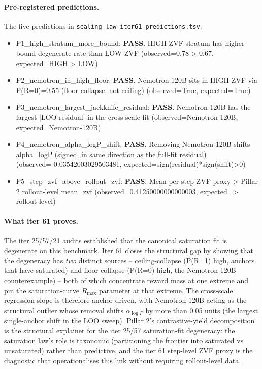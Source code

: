 \documentclass{article}
\begin{document}
\paragraph{Pre-registered predictions.}
The five predictions in \texttt{scaling\_law\_iter61\_predictions.tsv}:
\begin{itemize}
  \item P1_high_stratum_more_bound: \textbf{PASS}. HIGH-ZVF stratum has higher bound-degenerate rate than LOW-ZVF (observed=0.78 > 0.67, expected=HIGH > LOW)
  \item P2_nemotron_in_high_floor: \textbf{PASS}. Nemotron-120B sits in HIGH-ZVF via P(R=0)=0.55 (floor-collapse, not ceiling) (observed=True, expected=True)
  \item P3_nemotron_largest_jackknife_residual: \textbf{PASS}. Nemotron-120B has the largest |LOO residual| in the cross-scale fit (observed=Nemotron-120B, expected=Nemotron-120B)
  \item P4_nemotron_alpha_logP_shift: \textbf{PASS}. Removing Nemotron-120B shifts alpha_logP (signed, in same direction as the full-fit residual) (observed=-0.03542003029503481, expected=sign(residual)*sign(shift)>0)
  \item P5_step_zvf_above_rollout_zvf: \textbf{PASS}. Mean per-step ZVF proxy > Pillar 2 rollout-level mean_zvf (observed=0.41250000000000003, expected=> rollout-level)
\end{itemize}

\paragraph{What iter 61 proves.}
The iter 25/57/21 audits established that the canonical saturation
fit is degenerate on this benchmark.  Iter 61 closes the structural
gap by showing that the degeneracy has \emph{two} distinct
sources -- ceiling-collapse (P(R=1) high, anchors that have
saturated) and floor-collapse (P(R=0) high, the Nemotron-120B
counterexample) -- both of which concentrate reward mass at one
extreme and pin the saturation-curve \(R_{\max}\) parameter at
that extreme.  The cross-scale regression slope is therefore
anchor-driven, with Nemotron-120B acting as the structural outlier
whose removal shifts \(\alpha_{\log P}\) by more than 0.05
units (the largest single-anchor shift in the LOO sweep).
Pillar 2's contrastive-yield decomposition is the structural
explainer for the iter 25/57 saturation-fit degeneracy: the
saturation law's role is taxonomic (partitioning the frontier into
saturated vs unsaturated) rather than predictive, and the iter 61
step-level ZVF proxy is the diagnostic that operationalises this
link without requiring rollout-level data.
\end{document}
